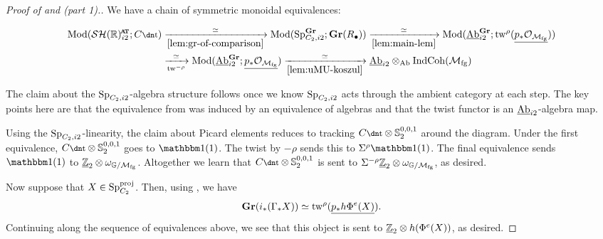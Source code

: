\begin{proof}[Proof of  and  (part 1).]
  We have a chain of symmetric monoidal equivalences:

  \begin{align*}
    \mathrm{Mod}(\SHRat; C\ta)
    &\xrightarrow[\ref{lem:gr-of-comparison}]{\simeq} \mathrm{Mod}( \Sp_{C_2, i2}^{\Gr}; \Gr(R_{\bullet}) ) 
    \xrightarrow[\ref{lem:main-lem}]{\simeq} \mathrm{Mod}( \uAb_{i2}^{\Gr}; \twist^{\rho} (\underline{p_*\mathcal{O}_{\Mfg}}) ) \\
    &\xrightarrow[\twist^{-\rho}]{\simeq} \mathrm{Mod}( \uAb_{i2}^{\Gr}; \underline{p_*\mathcal{O}_{\Mfg}} ) 
    \xrightarrow[\ref{lem:uMU-koszul}]{\simeq} \uAb_{i2} \otimes_{\Ab} \IndCoh(\Mfg)
  \end{align*}

  The claim about the $\operatorname{\mathrm{Sp}}_{C_2,i2}$-algebra structure follows once we know $\operatorname{\mathrm{Sp}}_{C_2,i2}$ acts through the ambient category at each step. 
  The key points here are
  that the equivalence from  was induced by an equivalence of algebras and
  that the twist functor is an $\underline{\mathrm{Ab}}_{i2}$-algebra map.

  Using the $\operatorname{\mathrm{Sp}}_{C_2,i2}$-linearity, the claim about Picard elements reduces to tracking $C\ta \otimes \Ss_2^{0,0,1}$ around the diagram. Under the first equivalence, $C\ta \otimes \Ss_2^{0,0,1}$ goes to $\o (1)$. The twist by $-\rho$ sends this to $\Sigma ^{\rho}\o (1)$. The final equivalence sends $\o(1)$ to $\underline{\mathbb{Z}}_{2} \otimes \omega_{\mathbb{G}/\mathcal{M}_{\mathrm{fg}}}$. Altogether we learn that $C\ta \otimes \Ss_2^{0,0,1}$ is sent to $\Sigma^{-\rho}\underline{\mathbb{Z}}_2 \otimes \omega_{\mathbb{G}/\mathcal{M}_{\mathrm{fg}}}$, as desired.

  Now suppose that $X \in \operatorname{\mathrm{Sp}}_{C_2}^{\mathrm{proj}}$.
  Then, using , we have
  \[\operatorname{\mathbf{Gr}}(i_* (\Gamma_* X)) \simeq \mathrm{tw}^{\rho} (\underline{p_* h \Phi^e (X) }). \]
  Continuing along the sequence of equivalences above, we see that this object is sent to
  $\underline{\mathbb{Z}}_{2} \otimes h(\Phi^e(X))$, as desired. \qedhere


  
  

\end{proof}

